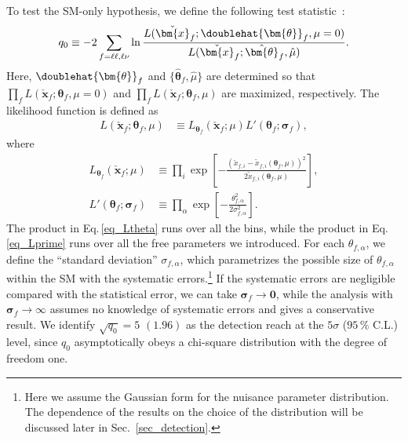 \documentclass[12pt,twoside,book]{article}
\begin{document}
To test the SM-only hypothesis, we define the following test statistic~\cite{Cowan:2010js}:
\begin{align}
  q_0 \equiv -2 \sum_{f=\ell \ell, \ell \nu} \ln \frac
  {L(\check{\bm{x}}_f ; \doublehat{\bm{\theta}}_f, \mu=0)}
  {L(\check{\bm{x}}_f ; \hat{\bm{\theta}}_f, \hat{\mu})}.
  \label{eq_q0}
\end{align}
Here, $\doublehat{\bm{\theta}}_f$ and $\{ \hat{\bm{\theta}}_f, \hat{\mu} \}$ are determined so that $\prod_f L(\check{\bm{x}}_f ; \bm{\theta}_f, \mu=0)$ and $\prod_f L(\check{\bm{x}}_f ; \bm{\theta}_f, \mu)$ are maximized, respectively.
The likelihood function is defined as
\begin{align}
  L(\check{\bm{x}}_f ; \bm{\theta}_f, \mu) &\equiv
  L_{\bm{\theta}_f} (\check{\bm{x}}_f ; \mu) L'(\bm{\theta}_f ; \bm{\sigma}_f),
  \label{eq_L}
\end{align}
where
\begin{align}
  L_{\bm{\theta}_f} (\check{\bm{x}}_f ; \mu) &\equiv
  \prod_{i} \exp \left[
  -\frac{(\check{x}_{f,i} - \tilde{x}_{f,i} (\bm{\theta}_f, \mu))^2}
  {2 \tilde{x}_{f,i} (\bm{\theta}_f, \mu)}
  \right],
  \label{eq_Ltheta}\\
  L'(\bm{\theta}_f ; \bm{\sigma}_f) &\equiv
  \prod_{\alpha} \exp \left[
  - \frac{\theta_{f,\alpha}^2}{2\sigma_{f,\alpha}^2}
  \right].
  \label{eq_Lprime}
\end{align}
The product in Eq.\,\eqref{eq_Ltheta} runs over all the bins, while the product in Eq.\,\eqref{eq_Lprime} runs over all the free parameters we introduced.
For each $\theta_{f, \alpha}$, we define the ``standard deviation'' $\sigma_{f, \alpha}$, which parametrizes the possible size of $\theta_{f, \alpha}$ within the SM with the
systematic errors.\footnote
{
  Here we assume the Gaussian form for the nuisance parameter distribution.  The dependence of the results on the choice of the distribution will be discussed later in Sec.~\ref{sec_detection}.
}
If the systematic errors are negligible compared with the statistical error, we can take $\bm{\sigma}_f \to \bm{0}$, while the analysis with $\bm{\sigma}_f \to \infty$ assumes no knowledge of systematic errors and gives a conservative result.
We identify $\sqrt{q_0} = 5$ $(1.96)$ as the detection reach at the $5\sigma$ ($95\,\%$ C.L.) level, since $q_0$ asymptotically obeys a chi-square distribution with the degree of freedom one.
\end{document}
